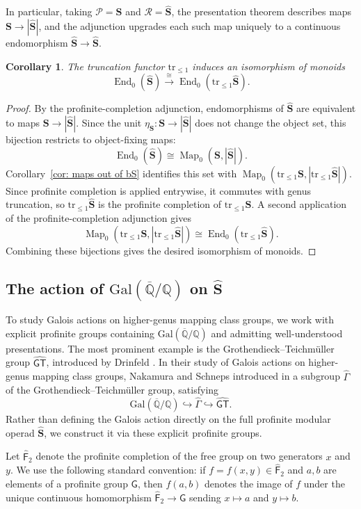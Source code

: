 \documentclass{amsart}
\newcommand{\F}{\mathsf{F}}
\newcommand{\bS}{\mathbf{S}}
\newcommand{\calP}{\mathcal{P}}
\newcommand{\galQ}{\mathbf{\mathrm{Gal}}(\overline{\mathbb{Q}}/\mathbb{Q})}
\newcommand{\End}{\operatorname{End}}
\newcommand{\Map}{\operatorname{Map}}
\newcommand{\trun}[1]{\mathrm{tr}_{\leq{#1}}}
\newcommand{\GT}{\widehat{\mathsf{GT}}}
\newcommand{\NS}{\widehat{\mathsf{\Gamma}}}
\newtheorem{cor}[theorem]{Corollary}%
\theoremstyle{definition}
\numberwithin{equation}{section}
\begin{document}
In particular, taking $\calP=\bS$ and $\mathcal R=\widehat{\bS}$, the presentation theorem describes maps $\bS\to|\widehat{\bS}|$, and the adjunction upgrades each such map uniquely to a continuous endomorphism $\widehat{\bS}\to\widehat{\bS}$. 


\begin{cor}\label{cor: truncation and endomorphisms of the surface mod operad}
The truncation functor $\trun{1}$ induces an isomorphism of monoids
\[
\End_0(\widehat{\bS})
\xrightarrow{\cong}
\End_0(\trun{1}\widehat{\bS}).
\]
\end{cor}

\begin{proof}
By the profinite-completion adjunction, endomorphisms of $\widehat{\bS}$ are equivalent to maps $\bS\to|\widehat{\bS}|$. Since the unit $\eta_{\bS}:\bS\to|\widehat{\bS}|$ does not change the object set, this bijection restricts to object-fixing maps:
\[
\End_0(\widehat{\bS})\cong \Map_0(\bS,|\widehat{\bS}|).
\]
Corollary~\ref{cor: maps out of bS} identifies this set with $\Map_0(\trun{1}\bS,|\trun{1}\widehat{\bS}|)$. Since profinite completion is applied entrywise, it commutes with genus truncation, so $\trun{1}\widehat{\bS}$ is the profinite completion of $\trun{1}\bS$. A second application of the profinite-completion adjunction gives
\[
\Map_0(\trun{1}\bS,|\trun{1}\widehat{\bS}|) \cong \End_0(\trun{1}\widehat{\bS}).
\]
Combining these bijections gives the desired isomorphism of monoids.
\end{proof}
\subsection{The action of $\galQ$ on $\widehat{\bS}$}\label{sec: NS}
To study Galois actions on higher-genus mapping class groups, we work with explicit profinite groups containing $\galQ$ and admitting well-understood presentations. The most prominent example is the Grothendieck--Teichmüller group $\GT$, introduced by Drinfeld \cite[Section~4]{Drin}. 
In their study of Galois actions on higher-genus mapping class groups, Nakamura and Schneps introduced in \cite{Nakamura-Schneps} a subgroup $\NS$ of the Grothendieck--Teichmüller group, satisfying
\[
\galQ\hookrightarrow \NS\hookrightarrow \GT.
\]
Rather than defining the Galois action directly on the full profinite modular operad $\widehat{\bS}$, we construct it via these explicit profinite groups.

Let $\widehat{\F}_2$ denote the profinite completion of the free group on two generators $x$ and $y$. We use the following standard convention: if $f=f(x,y)\in \widehat{\F}_2$ and $a,b$ are elements of a profinite group $\mathsf G$, then $f(a,b)$ denotes the image of $f$ under the unique
continuous homomorphism $\widehat{\F}_2\longrightarrow \mathsf G$ sending $x\mapsto a$ and $y\mapsto b$.
\end{document}

